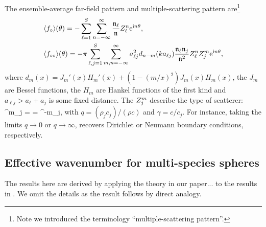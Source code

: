 \documentclass[12pt, a4paper]{article}
\begin{document}
The ensemble-average far-field pattern and multiple-scattering pattern are\footnote{Note we introduced the terminology ``multiple-scattering pattern''.}
\begin{align}
  &\langle f_\circ \rangle(\theta) = - \sum_{\ell=1}^S  \sum_{n=-\infty}^\infty  \frac{\mathfrak n_{\ell}}{\mathfrak n_{}} Z_\ell^n \textrm{e}^{\textrm{i} n \theta},
\notag \\
  &\langle f_{\circ\circ} \rangle(\theta) = - \pi  \sum_{\ell,j=1}^S \sum_{m,n=-\infty}^\infty  a_{\ell j}^2 d_{n-m}(k a_{\ell j})  \frac{\mathfrak n_{\ell} \mathfrak n_{j}}{\mathfrak n_{}^2}Z_\ell^n Z_j^m \textrm{e}^{\textrm{i} n \theta},
  \label{eqn:fcircs}
\end{align}
where $d_m(x) = J_m'(x) H_m'(x) + (1 - (m/x)^2)J_m(x) H_m(x)$, the $J_m$ are Bessel functions, the $H_m$ are Hankel functions of the first kind and $a_{\ell j} > a_\ell + a_j$ is some fixed distance. The  $Z^m_j$ describe the type of scatterer:
\be
\scatZ^m_j =  = \scatZ^{-m}_j,
\label{eqn:Zm}
\en
with $q = (\rho_j c_j)/(\rho c)$ and $\gamma = c/c_j$. For instance, taking the limits $q \to 0$ or $q \to \infty$, recovers Dirichlet or Neumann boundary conditions, respectively.

\subsection{Effective wavenumber for multi-species spheres}
\label{sec:Effective3D}

The results here are derived by applying the theory in our paper... to the results in \cite{linton_multiple_2006}. We omit the details as the result follows by direct analogy.
\end{document}
